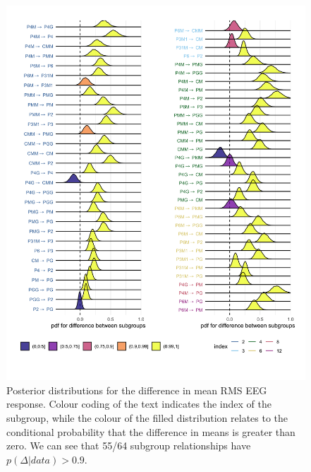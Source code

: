 \documentclass[9pt,twocolumn,twoside,lineno]{pnas-new}
\begin{document}
\begin{figure}%
\centering
\includegraphics[width=1\linewidth]{../analysis/plots/subgroup_comprms_Occ_Odd.png}
\caption{Posterior distributions for the difference in mean RMS EEG response. Colour coding of the text indicates the index of the subgroup, while the colour of the filled distribution relates to the conditional probability that the difference in means is greater than zero. We can see that 55/64 subgroup relationships have $p(\Delta|data)>0.9$.}
\label{fig:durations_rotations}
\end{figure}
\end{document}
